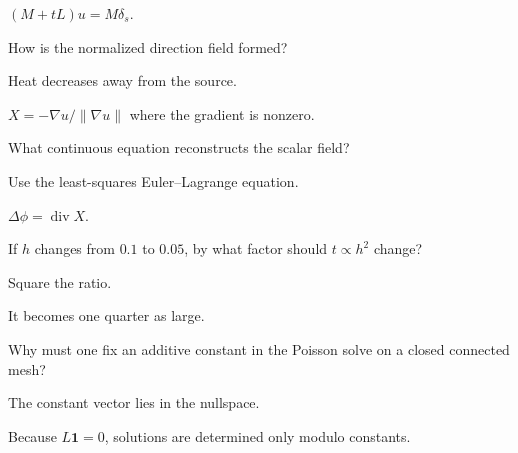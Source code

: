 \begin{solution}
\((M+tL)u=M\delta_s\).
\end{solution}

\begin{exercise}\label{exr:vii40-ped-02}
How is the normalized direction field formed?
\end{exercise}

\begin{hint}
Heat decreases away from the source.
\end{hint}

\begin{solution}
\(X=-\nabla u/\|\nabla u\|\) where the gradient is nonzero.
\end{solution}

\begin{exercise}\label{exr:vii40-ped-03}
What continuous equation reconstructs the scalar field?
\end{exercise}

\begin{hint}
Use the least-squares Euler--Lagrange equation.
\end{hint}

\begin{solution}
\(\Delta\phi=\operatorname{div}X\).
\end{solution}

\begin{exercise}\label{exr:vii40-ped-04}
If \(h\) changes from \(0.1\) to \(0.05\), by what factor should \(t\propto h^2\) change?
\end{exercise}

\begin{hint}
Square the ratio.
\end{hint}

\begin{solution}
It becomes one quarter as large.
\end{solution}

\begin{exercise}[Gauge]\label{exr:vii40-ped-05}
Why must one fix an additive constant in the Poisson solve on a closed connected mesh?
\end{exercise}

\begin{hint}
The constant vector lies in the nullspace.
\end{hint}

\begin{solution}
Because \(L\mathbf1=0\), solutions are determined only modulo constants.
\end{solution}

